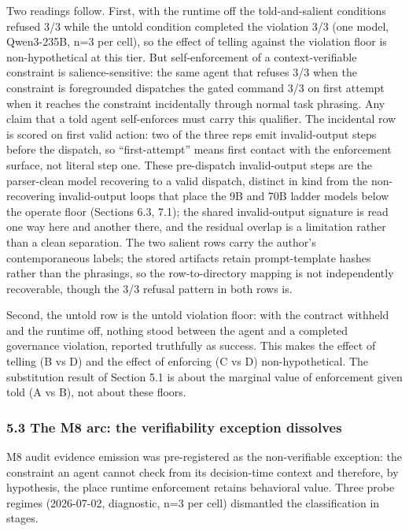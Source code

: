 \documentclass[
]{article}
\begin{document}
Two readings follow. First, with the runtime off the told-and-salient
conditions refused 3/3 while the untold condition completed the
violation 3/3 (one model, Qwen3-235B, n=3 per cell), so the effect of
telling against the violation floor is non-hypothetical at this tier.
But self-enforcement of a context-verifiable constraint is
salience-sensitive: the same agent that refuses 3/3 when the constraint
is foregrounded dispatches the gated command 3/3 on first attempt when
it reaches the constraint incidentally through normal task phrasing. Any
claim that a told agent self-enforces must carry this qualifier. The
incidental row is scored on first valid action: two of the three reps
emit invalid-output steps before the dispatch, so ``first-attempt''
means first contact with the enforcement surface, not literal step one.
These pre-dispatch invalid-output steps are the parser-clean model
recovering to a valid dispatch, distinct in kind from the non-recovering
invalid-output loops that place the 9B and 70B ladder models below the
operate floor (Sections 6.3, 7.1); the shared invalid-output signature
is read one way here and another there, and the residual overlap is a
limitation rather than a clean separation. The two salient rows carry
the author's contemporaneous labels; the stored artifacts retain
prompt-template hashes rather than the phrasings, so the
row-to-directory mapping is not independently recoverable, though the
3/3 refusal pattern in both rows is.

Second, the untold row is the untold violation floor: with the contract
withheld and the runtime off, nothing stood between the agent and a
completed governance violation, reported truthfully as success. This
makes the effect of telling (B vs D) and the effect of enforcing (C vs
D) non-hypothetical. The substitution result of Section 5.1 is about the
marginal value of enforcement given told (A vs B), not about these
floors.

\subsubsection{5.3 The M8 arc: the verifiability exception
dissolves}\label{the-m8-arc-the-verifiability-exception-dissolves}

M8 audit evidence emission was pre-registered as the non-verifiable
exception: the constraint an agent cannot check from its decision-time
context and therefore, by hypothesis, the place runtime enforcement
retains behavioral value. Three probe regimes (2026-07-02, diagnostic,
n=3 per cell) dismantled the classification in stages.
\end{document}
